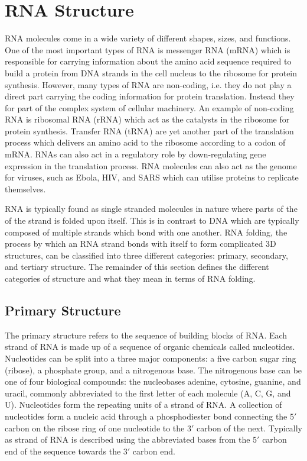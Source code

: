 \documentclass[journal]{IEEEtran}
\begin{document}
\section{RNA Structure}
\label{sec:rna-structure}
RNA molecules come in a wide variety of different shapes, sizes, and functions. One of the most important types of RNA is messenger RNA (mRNA) which is responsible for carrying information about the amino acid sequence required to build a protein from DNA strands in the cell nucleus to the ribosome for protein synthesis. However, many types of RNA are non-coding, i.e. they do not play a direct part carrying the coding information for protein translation. Instead they for part of the complex system of cellular machinery. An example of non-coding RNA is ribosomal RNA (rRNA) which act as the catalysts in the ribosome for protein synthesis. Transfer RNA (tRNA) are yet another part of the translation process which delivers an amino acid to the ribosome according to a codon of mRNA. RNAs can also act in a regulatory role by down-regulating gene expression in the translation process. RNA molecules can also act as the genome for viruses, such as Ebola, HIV, and SARS which can utilise proteins to replicate themselves.

RNA is typically found as single stranded molecules in nature where parts of the of the strand is folded upon itself. This is in contrast to DNA which are typically composed of multiple strands which bond with one another. RNA folding, the process by which an RNA strand bonds with itself to form complicated 3D structures, can be classified into three different categories: primary, secondary, and tertiary structure. The remainder of this section defines the different categories of structure and what they mean in terms of RNA folding.

\subsection{Primary Structure}
\label{subsec:primary-structure}

 The primary structure refers to the sequence of building blocks of RNA. Each strand of RNA is made up of a sequence of organic chemicals called nucleotides. Nucleotides can be split into a three major components: a five carbon sugar ring (ribose), a phosphate group, and a nitrogenous base. The nitrogenous base can be one of four biological compounds: the nucleobases adenine, cytosine, guanine, and uracil, commonly abbreviated to the first letter of each molecule (A, C, G, and U). Nucleotides form the repeating units of a strand of RNA. A collection of nucleotides form a nucleic acid through a phosphodiester bond connecting the 5$'$ carbon on the ribose ring of one nucleotide to the 3$'$ carbon of the next. Typically as strand of RNA is described using the abbreviated bases from the 5$'$ carbon end of the sequence towards the 3$'$ carbon end.
 
\end{document}
